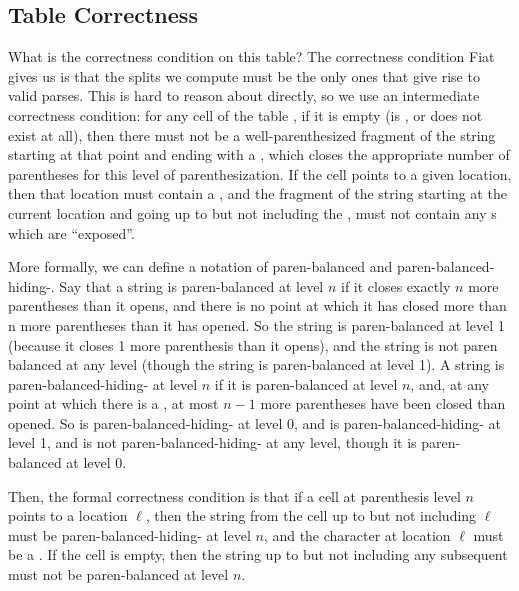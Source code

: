     
  \subsection{Table Correctness}
    What is the correctness condition on this table?  The correctness condition Fiat gives us is that the splits we compute must be the only ones that give rise to valid parses.  This is hard to reason about directly, so we use an intermediate correctness condition: for any cell of the table , if it is empty (is \nullentry, or does not exist at all), then there must not be a well-parenthesized fragment of the string starting at that point and ending with a \terminal{+}, which closes the appropriate number of parentheses for this level of parenthesization.   If the cell points to a given location, then that location must contain a \terminal{+}, and the fragment of the string starting at the current location and going up to but not including the \terminal{+}, must not contain any \terminal{+}s which are ``exposed''.  
    
    More formally, we can define a notation of paren-balanced and paren-balanced-hiding-\terminal{+}.  Say that a string is paren-balanced at level $n$ if it closes exactly $n$ more parentheses than it opens, and there is no point at which it has closed more than n more parentheses than it has opened.  So the string  is paren-balanced at level 1 (because it closes 1 more parenthesis than it opens), and the string  is not paren balanced at any level (though the string  is paren-balanced at level 1).  A string is paren-balanced-hiding-\terminal{+} at level $n$ if it is paren-balanced at level $n$, and, at any point at which there is a \terminal{+}, at most $n-1$ more parentheses have been closed than opened.  So  is paren-balanced-hiding-\terminal{+} at level 0, and  is paren-balanced-hiding-\terminal{+} at level 1, and  is not paren-balanced-hiding-\terminal{+} at any level, though it is paren-balanced at level 0.  
    
    Then, the formal correctness condition is that if a cell at parenthesis level $n$ points to a location $\ell$, then the string from the cell up to but not including $\ell$ must be paren-balanced-hiding-\terminal{+} at level $n$, and the character at location $\ell$ must be a \terminal{+}.  If the cell is empty, then the string up to but not including any subsequent \terminal{+} must not be paren-balanced at level $n$.
    
